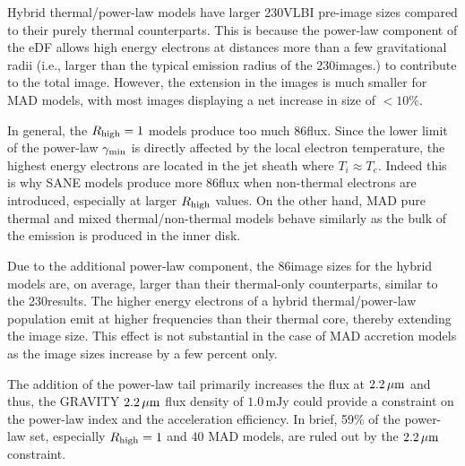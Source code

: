 Hybrid thermal/power-law models have larger 230\GHz VLBI pre-image sizes compared to their purely thermal counterparts.
This is because the power-law component of the eDF allows high energy electrons at distances more than a few gravitational radii (i.e., larger than the typical emission radius of the 230\GHz images.) to contribute to the total image.
However, the extension in the images is much smaller for MAD models, with most images displaying a net increase in size of $<10\%$.


In general, the $R_{\rm high}=1$ models produce too much 86\GHz flux.
Since the lower limit of the power-law $\gamma_{\rm min}$ is directly affected by the local electron temperature, the highest energy electrons are located in the jet sheath where $T_i \approx T_e$.
Indeed this is why SANE models produce more 86\GHz flux when non-thermal electrons are introduced, especially at larger $R_\mathrm{high}$ values.
On the other hand, MAD pure thermal and mixed thermal/non-thermal models behave similarly as the bulk of the emission is produced in the inner disk.

Due to the additional power-law component, the 86\GHz image sizes for the hybrid \hamr models are, on average, larger than their thermal-only counterparts, similar to the 230\GHz results.
The higher energy electrons of a hybrid thermal/power-law population emit at higher frequencies than their thermal core, thereby extending the image size.
This effect is not substantial in the case of MAD accretion models as the image sizes increase by a few percent only.


The addition of the power-law tail primarily increases the flux at $2.2\,\mu\mathrm{m}$ and thus, the GRAVITY $2.2\,\mu\mathrm{m}$ flux density of $1.0\,\mathrm{mJy}$ could provide a constraint on the power-law index and the acceleration efficiency.
In brief, 59\% of the power-law set, especially $R_\mathrm{high}=1$ and $40$ MAD models, are ruled out by the $2.2\,\mu\mathrm{m}$ constraint.


